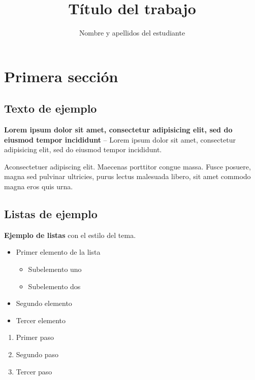 \documentclass[aspectratio=169,t]{beamer}
\title{Título del trabajo}
\author{Nombre y apellidos del estudiante}
\begin{document}
  \maketitle

  \tableofcontents

  \section{Primera sección}
    \subsection{Texto de ejemplo}

      \begin{frame}
        \textbf{Lorem ipsum dolor sit amet, consectetur adipisicing elit, sed do eiusmod tempor incididunt} -- Lorem ipsum dolor sit amet, consectetur adipisicing elit, sed do eiusmod tempor incididunt.

        Aconsectetuer adipiscing elit. Maecenas porttitor congue massa. Fusce posuere, magna sed pulvinar ultricies, purus lectus malesuada libero, sit amet commodo magna eros quis urna.
      \end{frame}

    \subsection{Listas de ejemplo}

      \begin{frame}
        \textbf{Ejemplo de listas} con el estilo del tema.

        \begin{itemize}
          \item Primer elemento de la lista
          \begin{itemize}
            \item Subelemento uno
            \item Subelemento dos
          \end{itemize}
          \item Segundo elemento
          \item Tercer elemento
        \end{itemize}

        \begin{enumerate}
          \item Primer paso
          \item Segundo paso
          \item Tercer paso
        \end{enumerate}
      \end{frame}

  \closingslide
\end{document}
